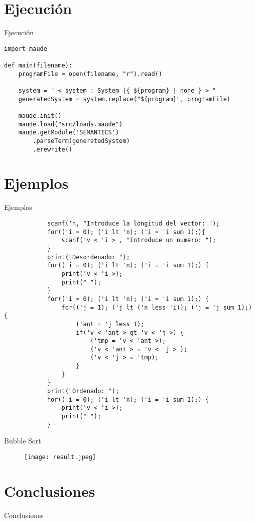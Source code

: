 \documentclass{beamer}
\begin{document}
    \section{Ejecución}
    \begin{frame}[fragile]{Ejecución}
        \begin{verbatim}  
import maude
     
def main(filename):
    programFile = open(filename, "r").read()
            
    system = " < system : System |{ ${program} | none } > "
    generatedSystem = system.replace("${program}", programFile)
            
    maude.init()
    maude.load("src/loads.maude")
    maude.getModule('SEMANTICS')
        .parseTerm(generatedSystem)
        .erewrite()
        \end{verbatim}
    \end{frame}
    
    \section{Ejemplos}
    \begin{frame}[fragile]{Ejemplos}
        \begin{verbatim}  
            scanf('n, "Introduce la longitud del vector: ");
            for(('i = 0); ('i lt 'n); ('i = 'i sum 1);){
                scanf('v < 'i > , "Introduce un numero: ");
            }
            print("Desordenado: ");
            for(('i = 0); ('i lt 'n); ('i = 'i sum 1);) {
                print('v < 'i >);
                print(" ");
            }
            for(('i = 0); ('i lt 'n); ('i = 'i sum 1);) {
                for(('j = 1); ('j lt ('n less 'i)); ('j = 'j sum 1);) {
                    ('ant = 'j less 1);
                    if('v < 'ant > gt 'v < 'j >) {
                        ('tmp = 'v < 'ant >);
                        ('v < 'ant > = 'v < 'j > );
                        ('v < 'j > = 'tmp);
                    }
                }
            }
            print("Ordenado: ");
            for(('i = 0); ('i lt 'n); ('i = 'i sum 1);) {
                print('v < 'i >);
                print(" ");
            }
        \end{verbatim}
    \end{frame}

    \begin{frame}[fragile]{Bubble Sort}
        \begin{figure}
            \texttt{[image: result.jpeg]}
        \end{figure}
    \end{frame}


    \section{Conclusiones}
    \begin{frame}{Conclusiones}
    \end{frame}
\end{document}
